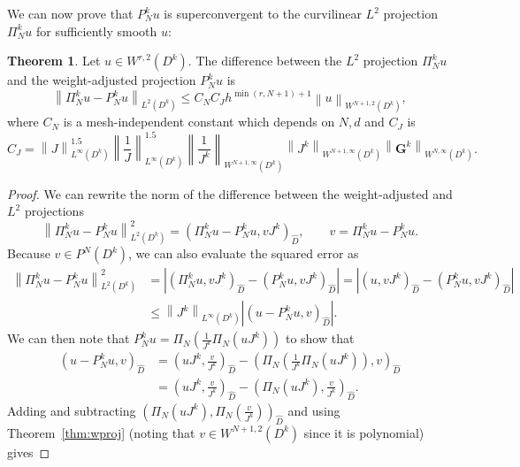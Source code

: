 \documentclass[preprint,10pt]{article}
\theoremstyle{definition}
\theoremstyle{lemma}
\theoremstyle{theorem}
\newtheorem{theorem}{Theorem}
\theoremstyle{assumption}
\renewcommand{\hat}{\widehat}
\newcommand{\nor}[1]{\left\| #1 \right\|}
\newcommand{\LRp}[1]{\left( #1 \right)}
\newcommand{\LRb}[1]{\left| #1 \right|}
\begin{document}
{We can now prove that $P_N^k u$ is superconvergent to the curvilinear $L^2$ projection $\Pi_N^k u$ for sufficiently smooth $u$:
\begin{theorem}
Let $u \in W^{r,2}\LRp{D^k}$.  The difference between the $L^2$ projection $\Pi^k_Nu$ and the weight-adjusted projection $P_N^k u$ is
\[
\nor{\Pi_N^k u - P_N^k  u}_{L^2\LRp{D^k}} \leq C_N C_J h^{\min\LRp{r,N+1}+1}\nor{u}_{W^{N+1,2}\LRp{D^k}},
\]
where $C_N$ is a mesh-independent constant which depends on $N, d$ and $C_J$ is
\[
C_J = \nor{J}_{L^{\infty}\LRp{D^k}}^{1.5}  \nor{\frac{1}{J}}_{L^{\infty}\LRp{D^k}}^{1.5} \nor{\frac{1}{J^k}}_{W^{N+1,\infty}\LRp{D^k}}\nor{J^k}_{W^{N+1,\infty}\LRp{D^k}}\nor{\bm{G}^k}_{W^{N,\infty}\LRp{D^k}}.
\]
\label{thm:superconverge}
\end{theorem}
\begin{proof}
We can rewrite the norm of the difference between the weight-adjusted and $L^2$ projections
\[
\nor{\Pi_N^k  u - P_N^k  u}_{L^2\LRp{D^k}}^2 = \LRp{\Pi_N^k  u - P_N^k  u,vJ^k}_{\hat{D}}, \qquad v = \Pi_N^k  u - P_N^k  u.
\]
Because $v \in P^N\LRp{D^k}$, we can also evaluate the squared error as
\begin{align*}
\nor{\Pi_N^k  u - P_N^k  u}_{L^2\LRp{D^k}}^2 &= \LRb{\LRp{\Pi_N^k u,vJ^k}_{\hat{D}} - \LRp{P_N^k  u,vJ^k}_{\hat{D}}} = \LRb{\LRp{u,vJ^k}_{\hat{D}} - \LRp{P_N^k  u,vJ^k}_{\hat{D}}} \\
&\leq \nor{J^k}_{L^{\infty}\LRp{D^k}} \LRb{\LRp{u-P_N^ku,v}_{\hat{D}}}.%
\end{align*}
We can then note that $P_N^ku = \Pi_N\LRp{\frac{1}{J^k} \Pi_N\LRp{uJ^k}}$ to show that
\begin{align*}
{\LRp{u-P_N^ku,v}_{\hat{D}}} &= {\LRp{uJ^k,\frac{v}{J^k}}_{\hat{D}}-\LRp{\Pi_N\LRp{\frac{1}{J^k} \Pi_N\LRp{uJ^k}},v}_{\hat{D}}} \\
&= \LRp{uJ^k,\frac{v}{J^k}}_{\hat{D}}-\LRp{\Pi_N\LRp{uJ^k},\frac{v}{J^k}}_{\hat{D}}. %
\end{align*}
Adding and subtracting $\LRp{\Pi_N\LRp{uJ^k},\Pi_N\LRp{\frac{v}{J^k}}}_{\hat{D}}$ and using Theorem~\ref{thm:wproj} (noting that $v\in W^{N+1,2}\LRp{D^k}$ since it is polynomial) gives

\end{proof}}
\end{document}

